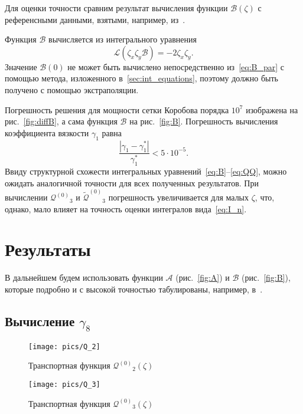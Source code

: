 \documentclass[a4paper,12pt]{article}
\newcommand{\Q}{\ensuremath{\mathcal{Q}^{(0)}}}
\newcommand{\QQ}{\ensuremath{\tilde{\mathcal{Q}}^{(0)}}}
\begin{document}
Для оценки точности сравним результат вычисления функции \(\mathcal{B}(\zeta)\)
с референсными данными, взятыми, например, из~\cite{Sone2002}.

Функция \(\mathcal{B}\) вычисляется из интегрального уравнения
\begin{equation}\label{eq:B_par}
    \mathcal{L}(\zeta_x\zeta_y\mathcal{B}) = -2\zeta_x\zeta_y.
\end{equation}
Значение \(\mathcal{B}(0)\) не может быть вычислено непосредственно из~\eqref{eq:B_par}
с помощью метода, изложенного в~\ref{sec:int_equations},
поэтому должно быть получено с помощью экстраполяции.

Погрешность решения для мощности сетки Коробова порядка \(10^7\) изображена на рис.~\ref{fig:diffB},
а сама функция \(\mathcal{B}\) на рис.~\ref{fig:B}.
Погрешность вычисления коэффициента вязкости \(\gamma_1\) равна
\begin{equation}\label{eq:gamma_error}
    \frac{|\gamma_1-\gamma_1^*|}{\gamma_1^*} < 5\cdot10^{-5}.
\end{equation}
Ввиду структурной схожести интегральных уравнений~\eqref{eq:B}--\eqref{eq:QQ},
можно ожидать аналогичной точности для всех полученных результатов.
При вычислении \(\Q_3\) и \(\QQ_3\) погрешность увеличивается для малых \(\zeta\),
что, однако, мало влияет на точность оценки интегралов вида~\eqref{eq:I_n}.


\section{Результаты}

В дальнейшем будем использовать функции \(\mathcal{A}\) (рис.~\ref{fig:A}) и \(\mathcal{B}\) (рис.~\ref{fig:B}),
которые подробно и с высокой точностью табулированы, например, в~\cite{Sone2002}.

\subsection{Вычисление \texorpdfstring{$\gamma_8$}{gamma8}}

\begin{figure}
    \centering
    \begin{minipage}[b]{0.5\textwidth}
        \centering
        \texttt{[image: pics/Q\_2]}
        \caption{Транспортная функция \(\Q_2(\zeta)\)}
        \label{fig:Q2}
    \end{minipage}%
    \begin{minipage}[b]{0.5\textwidth}
        \centering
        \texttt{[image: pics/Q\_3]}
        \caption{Транспортная функция \(\Q_3(\zeta)\)}
        \label{fig:Q3}
    \end{minipage}
\end{figure}
\end{document}
